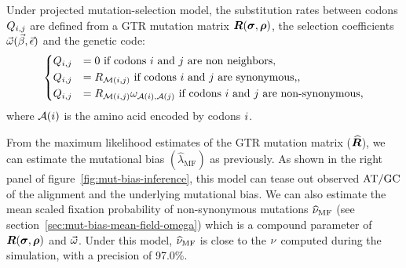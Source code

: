 Under projected mutation-selection model, the substitution rates between codons $Q_{{i}, {j}}$ are defined from a GTR mutation matrix $\bm{R}(\bm{\sigma}, \bm{\rho})$, the selection coefficients $\vec{\omega}(\vec{\beta}, \vec{\epsilon})$ and the genetic code:
\begin{equation}
    \begin{dcases}
        Q_{{i}, {j}} & = 0 \text{ if codons ${i}$ and ${j}$ are non neighbors}, \\
        Q_{{i}, {j}} & = R_{\mathcal{M}({i}, {j})} \text{ if codons ${i}$ and ${j}$ are synonymous,}, \\
        Q_{{i}, {j}} & = R_{\mathcal{M}({i}, {j})} \omega_{\mathcal{A}({i}), \mathcal{A}({j})} \text{ if codons ${i}$ and ${j}$ are non-synonymous},
    \end{dcases}
    \label{eq:codon-mean-field}
\end{equation}
where $\mathcal{A}({i})$ is the amino acid encoded by codons ${i}$.

From the maximum likelihood estimates of the \acrshort{GTR} mutation matrix ($\widehat{\bm{R}}$), we can estimate the mutational bias $\left({\widehat{\lambda}_{\text{MF}}} \right)$ as previously.
As shown in the right panel of figure~\ref{fig:mut-bias-inference}, this model can tease out observed $\text{AT/GC}$ of the alignment and the underlying mutational bias.
We can also estimate the mean scaled fixation probability of non-synonymous mutations $\widehat{\nu}_{\text{MF}}$ (see section~\ref{sec:mut-bias-mean-field-omega}) which is a compound parameter of $\bm{R}(\bm{\sigma}, \bm{\rho})$ and $\vec{\omega}$.
Under this model, $\widehat{\nu}_{\text{MF}}$ is close to the $\nu$ computed during the simulation, with a precision of 97.0\%.

